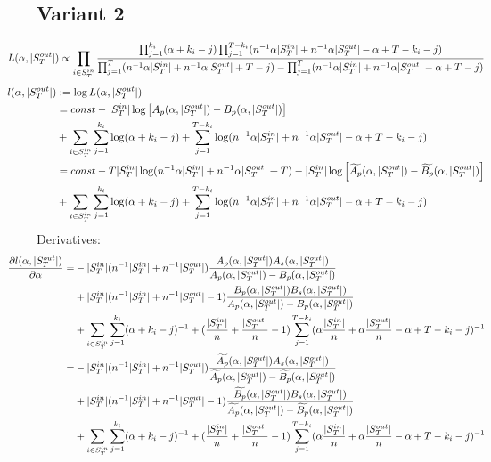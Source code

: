 \documentclass[a4paper, 12pt]{article}
\newcommand{\sout}{|S^{out}_T|}
\newcommand{\sint}{|S^{in}_T|}
\begin{document}
\subsection{Variant 2}
\begin{align*}
    \hspace*{-1cm}
    L(\alpha, \sout) &\propto \prod_{i \in S_T^{in}} \frac{\prod_{j=1}^{k_i} (\alpha + k_i - j)\prod_{j=1}^{T - k_i} (n^{-1} \alpha \sint + n^{-1} \alpha \sout -\alpha + T - k_i - j)}{\prod_{j=1}^T(n^{-1}\alpha \sint + n^{-1} \alpha \sout + T - j) - \prod_{j=1}^T (n^{-1} \alpha \sint + n^{-1} \alpha \sout - \alpha + T - j)} \\
\end{align*}
\begin{align} \label{eq:7}
    \hspace*{-1cm}
    l(\alpha, \sout) &:= \log L(\alpha, \sout) \nonumber \\
    &= const - \sint \log \left[A_p(\alpha, \sout) - B_p(\alpha, \sout) \right] \nonumber \\
    &+ \sum_{i \in S_T^{in}} \sum_{j = 1}^{k_i} \log(\alpha + k_i - j) + \sum_{j = 1}^{T - k_i} \log(n^{-1} \alpha \sint + n^{-1} \alpha \sout - \alpha + T - k_i - j) \nonumber \\
    &= const - T\sint \log(n^{-1}\alpha\sint + n^{-1}\alpha\sout + T) - \sint \log \left[\widetilde{A_p}(\alpha, \sout) - \widetilde{B_p}(\alpha, \sout) \right] \nonumber \\
    &+ \sum_{i \in S_T^{in}} \sum_{j = 1}^{k_i} \log(\alpha + k_i - j) + \sum_{j = 1}^{T - k_i} \log(n^{-1} \alpha \sint + n^{-1} \alpha \sout - \alpha + T - k_i - j) \nonumber \\
\end{align}
Derivatives:
\begin{align} \label{eq:8}
    \hspace{-1cm}
    \frac{\partial l(\alpha, \sout)}{\partial \alpha} =& -\sint(n^{-1}\sint + n^{-1}\sout) \frac{ A_p(\alpha, \sout) A_s(\alpha, \sout)}{A_p(\alpha, \sout) - B_p(\alpha, \sout)}\nonumber \\
    &+ \sint (n^{-1}\sint + n^{-1}\sout - 1) \frac{B_p(\alpha, \sout) B_s(\alpha, \sout)}{A_p(\alpha, \sout) - B_p(\alpha, \sout)}\nonumber \\
    &+ \sum_{i \in S_T^{in}} \sum_{j = 1}^{k_i} (\alpha + k_i - j)^{-1} + (\frac{\sint}{n} + \frac{\sout}{n} - 1) \sum_{j = 1}^{T - k_i} (\alpha \frac{\sint}{n} + \alpha \frac{\sout}{n} - \alpha + T - k_i - j)^{-1} \nonumber \\
    =& -\sint(n^{-1}\sint + n^{-1}\sout) \frac{ \widetilde{A_p}(\alpha, \sout) A_s(\alpha, \sout)}{\widetilde{A_p}(\alpha, \sout) - \widetilde{B_p}(\alpha, \sout)}\nonumber \\
    &+ \sint(n^{-1}\sint + n^{-1}\sout - 1) \frac{ \widetilde{B_p}(\alpha, \sout) B_s(\alpha, \sout)}{\widetilde{A_p}(\alpha, \sout) - \widetilde{B_p}(\alpha, \sout)}\nonumber \\
    &+ \sum_{i \in S_T^{in}} \sum_{j = 1}^{k_i} (\alpha + k_i - j)^{-1} + (\frac{\sint}{n} + \frac{\sout}{n} - 1) \sum_{j = 1}^{T - k_i} (\alpha \frac{\sint}{n} + \alpha \frac{\sout}{n} - \alpha + T - k_i - j)^{-1} \nonumber \\
\end{align}
\end{document}
